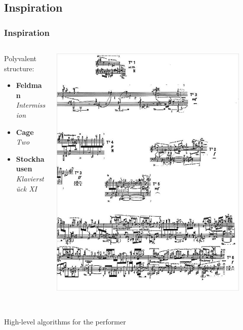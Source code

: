 \documentclass{beamer}
\begin{document}
\subsection{Inspiration}
\begin{frame}
    \frametitle{Inspiration}
    \Large
    \begin{columns}
        \begin{column}{0.45\textwidth}
            Polyvalent structure:
            \begin{itemize}
                \item \textbf{Feldman}~\\\textit{Intermission}
                \item \textbf{Cage}~\\\textit{Two}
                \item \textbf{Stockhausen}~\\\textit{Klavierstück XI}
            \end{itemize}
        \end{column}
        \begin{column}{0.45\textwidth}
            \includegraphics[width=0.9\textwidth]{images/klavierstuck.jpg}
        \end{column}
    \end{columns}~\\
    \vspace{5mm}
    \centering High-level algorithms for the performer
\end{frame}
\end{document}
